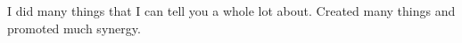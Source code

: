     	I did many things that I can tell you a whole lot about. Created many things and promoted much synergy.
